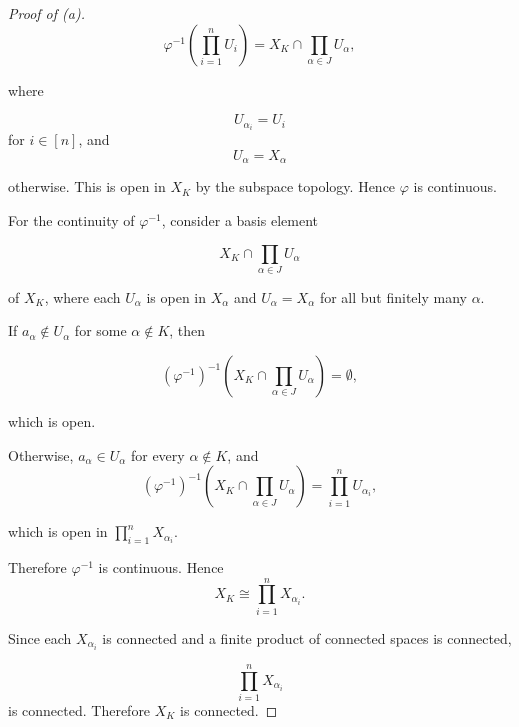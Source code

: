 \begin{proof}[Proof of (a)]
    \[
        \varphi^{-1}\left(\prod_{i=1}^n U_i\right)
        =
        X_K \cap \prod_{\alpha\in J} U_\alpha,
    \]

    where

    \[
        U_{\alpha_i}=U_i
    \]
    for $i\in[n]$, and
    \[
        U_\alpha=X_\alpha
    \]

    otherwise. This is open in $X_K$ by the subspace topology.
    Hence $\varphi$ is continuous.

    For the continuity of $\varphi^{-1}$, consider a basis element
    
    \[
        X_K\cap\prod_{\alpha\in J}U_\alpha
    \]

    of $X_K$, where each $U_\alpha$ is open in $X_\alpha$
    and $U_\alpha=X_\alpha$ for all but finitely many $\alpha$.

    If $a_\alpha\notin U_\alpha$ for some $\alpha\notin K$, then
    
    \[
        (\varphi^{-1})^{-1}
        \left(
        X_K\cap\prod_{\alpha\in J}U_\alpha
        \right)
        =
        \emptyset,
    \]

    which is open.

    Otherwise, $a_\alpha\in U_\alpha$ for every
    $\alpha\notin K$, and
    \[
        (\varphi^{-1})^{-1}
        \left(
        X_K\cap\prod_{\alpha\in J}U_\alpha
        \right)
        =
        \prod_{i=1}^n U_{\alpha_i},
    \]

    which is open in
    $\prod_{i=1}^n X_{\alpha_i}$.

    Therefore $\varphi^{-1}$ is continuous. Hence
    \[
        X_K\cong\prod_{i=1}^n X_{\alpha_i}.
    \]

    Since each $X_{\alpha_i}$ is connected and a finite product
    of connected spaces is connected,
    
    \[
        \prod_{i=1}^n X_{\alpha_i}
    \]
    is connected. Therefore $X_K$ is connected.
\end{proof} 

